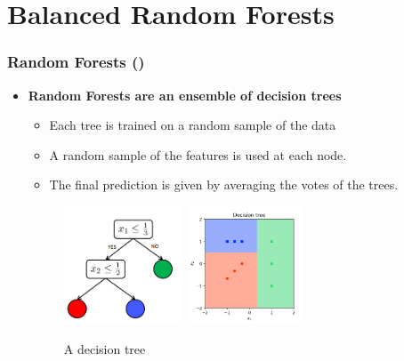 \documentclass[slidestop,compress,red,mathserif]{beamer}
\begin{document}
\section{Balanced Random Forests}

\begin{frame}
\frametitle{Random Forests (\cite{Breiman2001})}
\begin{itemize}
  \item[] \textbf{Random Forests are an ensemble of decision trees}
    \begin{itemize}
      \item Each tree is trained on a random sample of the data
      \item A random sample of the features is used at each node.
      \item The final prediction is given by averaging the votes of the trees.
    \end{itemize}
    \noindent
    \begin{figure}
      \includegraphics[height=3.5cm, keepaspectratio]{Figures/example_decision_tree.png}
      \includegraphics[height=3.5cm, keepaspectratio]{Figures/example_decision_tree_data.png}
      \caption{A decision tree}
      \end{figure}
  \end{itemize}
\end{frame}
\end{document}
